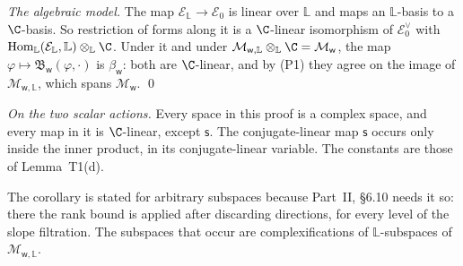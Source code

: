 \documentclass[11pt,letterpaper]{article}
\begin{document}
\emph{The algebraic model.} The map $\mathcal E_{\mathbb L}\to\mathcal E_0$ is linear over $\mathbb L$ and maps
an $\mathbb L$-basis to a $\C$-basis. So restriction of forms along it is a $\C$-linear isomorphism of
$\mathcal E_0^\vee$ with $\operatorname{Hom}_{\mathbb L}(\mathcal E_{\mathbb L},\mathbb L)\otimes_{\mathbb L}\C$.
Under it and under $\mathcal M_{\mathsf w,\mathbb L}\otimes_{\mathbb L}\C=\mathcal M_{\mathsf w}$, the map
$\varphi\mapsto\mathfrak B_{\mathsf w}(\varphi,\cdot)$ is $\beta_{\mathsf w}$: both are $\C$-linear, and by (P1)
they agree on the image of $\mathcal M_{\mathsf w,\mathbb L}$, which spans $\mathcal M_{\mathsf w}$. \qed

\emph{On the two scalar actions.} Every space in this proof is a complex space, and every map in it is
$\C$-linear, except $\mathsf s$. The conjugate-linear map $\mathsf s$ occurs only inside the inner product,
in its conjugate-linear variable. The constants are those of Lemma~T1(d).

The corollary is stated for arbitrary subspaces because Part~II, \S6.10 needs it so: there the rank bound is
applied after discarding directions, for every level of the slope filtration. The subspaces that occur are
complexifications of $\mathbb L$-subspaces of $\mathcal M_{\mathsf w,\mathbb L}$.
\end{document}
